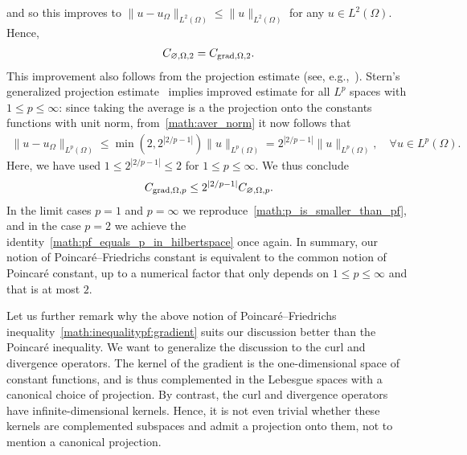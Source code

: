 \documentclass[10pt,a4paper]{article}
\begin{document}
and so this improves to $\| u - u_\Omega \|_{L^{2}(\Omega)} \leq \| u \|_{L^{2}(\Omega)}$ for any $u \in L^{2}(\Omega)$. 
Hence,
\begin{align}\label{math:pf_equals_p_in_hilbertspace}
    C_{\varnothing,\Omega,2} = C_{\operatorname{grad},\Omega,2}. 
\end{align}
This improvement also follows from the projection estimate (see, e.g.,~\cite{xu2003some}).
Stern's generalized projection estimate~\cite[Theorem~4.1,Remark~5.1]{stern2015banach} implies improved estimate for all $L^{p}$ spaces with $1 \leq p \leq \infty$:
since taking the average is a the projection onto the constants functions with unit norm, from~\eqref{math:aver_norm} it now follows that 
\begin{align*}
    \| u - u_\Omega \|_{L^{p}(\Omega)}
    \leq 
    \min\left( 2, 2^{|2/p-1|} \right)
    \| u \|_{L^{p}(\Omega)}
    = 
    2^{|2/p-1|} 
    \| u \|_{L^{p}(\Omega)}
    ,
    \quad 
    \forall 
    u \in L^{p}(\Omega)
    .
\end{align*}
Here, we have used $1 \leq 2^{|2/p-1|} \leq 2$ for $1 \leq p \leq \infty$.
We thus conclude 
\begin{align}\label{math:p_vs_pf}
    C_{\operatorname{grad},\Omega,p} \leq 2^{|2/p-1|} C_{\varnothing,\Omega,p}.
\end{align}
In the limit cases $p = 1$ and $p = \infty$ we reproduce~\eqref{math:p_is_smaller_than_pf}, 
and in the case $p = 2$ we achieve the identity~\eqref{math:pf_equals_p_in_hilbertspace} once again.
In summary, our notion of Poincar\'e--Friedrichs constant is equivalent to the common notion of Poincar\'e constant, up to a numerical factor that only depends on $1 \leq p \leq \infty$ and that is at most $2$.

\begin{remark}
    Let us further remark why the above notion of Poincar\'e--Friedrichs inequality~\eqref{math:inequalitypf:gradient} suits our discussion better than the Poincar\'e inequality. 
    We want to generalize the discussion to the curl and divergence operators. 
    The kernel of the gradient is the one-dimensional space of constant functions, and is thus complemented in the Lebesgue spaces with a canonical choice of projection. 
    By contrast, the curl and divergence operators have infinite-dimensional kernels. 
    Hence, it is not even trivial whether these kernels are complemented subspaces and admit a projection onto them, not to mention a canonical projection. 
\end{remark}
\end{document}
